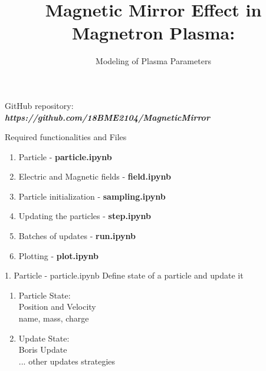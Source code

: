 \documentclass{beamer}
\title[]{Magnetic Mirror Effect in Magnetron Plasma:}
\subtitle{Modeling of Plasma Parameters}
\begin{document}
	
	\begin{frame}
		\titlepage	
	\end{frame}	
	
	\begin{frame}
		\begin{block}{GitHub repository:} 
		 \phantom{a} \\
		 \hspace{1.5cm}
		 \textbf{\textit{https://github.com/18BME2104/MagneticMirror}} \\
		\phantom{a}
		\end{block}
	\vspace{0.5cm}
		\begin{block}{Required functionalities and Files}
			\begin{enumerate}
				\item Particle - \textbf{particle.ipynb}
				\item Electric and Magnetic fields - \textbf{field.ipynb}
				\item Particle initialization - \textbf{sampling.ipynb}
				\item Updating the particles - \textbf{step.ipynb}
				\item Batches of updates - \textbf{run.ipynb}
				\item Plotting - \textbf{plot.ipynb}
			\end{enumerate}	
		\end{block}
		
	\end{frame}

	\begin{frame}[t]{1. Particle - particle.ipynb}
		Define state of a particle and update it \\
		\vspace{1cm}
		\begin{enumerate}
			\item Particle State: \\
			Position and Velocity \\
			name, mass, charge
			\item Update State: \\
			Boris Update \\
			... other updates strategies
		\end{enumerate}
	\end{frame}
	
\end{document}
